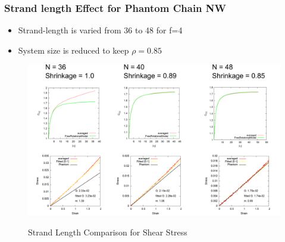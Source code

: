 \documentclass[12pt, dvipdfmx]{beamer}
\begin{document}
\begin{frame}
	\frametitle{
		Strand length Effect for Phantom Chain NW
	}
	\begin{itemize}
		\item Strand-length is varied from 36 to 48 for f=4
		\item System size is \alert{reduced to keep $\rho = 0.85$}
	\end{itemize}

	\begin{figure}[htb]
		\centering
			\includegraphics[width=.8\textwidth]{N36_N40_N48.png}

			\scriptsize{Strand Length Comparison for Shear Stress}
	\end{figure}

\end{frame}
\end{document}
